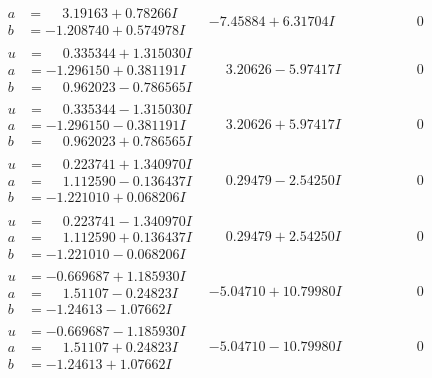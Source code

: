 \documentclass[1p]{elsarticle_modified}
\theoremstyle{definition}
\begin{document}
$$\begin{array}{c|c|c}
\begin{aligned}
a &= \phantom{-}3.19163 + 0.78266 I \\
b &= -1.208740 + 0.574978 I\end{aligned}
 & -7.45884 + 6.31704 I & \phantom{-0.000000 } 0 \\ \hline\begin{aligned}
u &= \phantom{-}0.335344 + 1.315030 I \\
a &= -1.296150 + 0.381191 I \\
b &= \phantom{-}0.962023 - 0.786565 I\end{aligned}
 & \phantom{-}3.20626 - 5.97417 I & \phantom{-0.000000 } 0 \\ \hline\begin{aligned}
u &= \phantom{-}0.335344 - 1.315030 I \\
a &= -1.296150 - 0.381191 I \\
b &= \phantom{-}0.962023 + 0.786565 I\end{aligned}
 & \phantom{-}3.20626 + 5.97417 I & \phantom{-0.000000 } 0 \\ \hline\begin{aligned}
u &= \phantom{-}0.223741 + 1.340970 I \\
a &= \phantom{-}1.112590 - 0.136437 I \\
b &= -1.221010 + 0.068206 I\end{aligned}
 & \phantom{-}0.29479 - 2.54250 I & \phantom{-0.000000 } 0 \\ \hline\begin{aligned}
u &= \phantom{-}0.223741 - 1.340970 I \\
a &= \phantom{-}1.112590 + 0.136437 I \\
b &= -1.221010 - 0.068206 I\end{aligned}
 & \phantom{-}0.29479 + 2.54250 I & \phantom{-0.000000 } 0 \\ \hline\begin{aligned}
u &= -0.669687 + 1.185930 I \\
a &= \phantom{-}1.51107 - 0.24823 I \\
b &= -1.24613 - 1.07662 I\end{aligned}
 & -5.04710 + 10.79980 I & \phantom{-0.000000 } 0 \\ \hline\begin{aligned}
u &= -0.669687 - 1.185930 I \\
a &= \phantom{-}1.51107 + 0.24823 I \\
b &= -1.24613 + 1.07662 I\end{aligned}
 & -5.04710 - 10.79980 I & \phantom{-0.000000 } 0 \\ \hline\begin{aligned}

\end{aligned}
\end{array}$$
\end{document}
